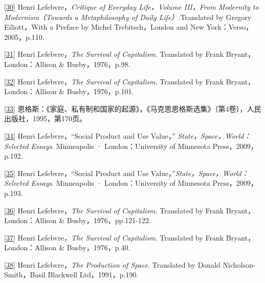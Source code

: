 \documentclass[UTF8, fontset = sourcesans, a4paper, oneside, zihao =
-4, scheme=chinese, no-math, space=true]{ctexbook}
\begin{document}
\protect\hypertarget{part0008_split_003.htmlux5cux23m30}{}{}\protect\hyperlink{part0008_split_002.htmlux5cux23w30}{{[}30{]}}
Henri Lefebvre，\emph{Critique of Everyday Life，Volume III，From
Modernity to Modernism（Towards a Metaphilosophy of Daily
Life）}.Translated by Gregory Eiliott，With a Preface by Michel
Trebitsch，London and New York：Verso，2005，p.110.

\protect\hypertarget{part0008_split_003.htmlux5cux23m31}{}{}\protect\hyperlink{part0008_split_002.htmlux5cux23w31}{{[}31{]}}
Henri Lefebvre，\emph{The Survival of Capitalism}. Translated by Frank
Bryant，London：Allison \& Busby，1976，p.98.

\protect\hypertarget{part0008_split_003.htmlux5cux23m32}{}{}\protect\hyperlink{part0008_split_002.htmlux5cux23w32}{{[}32{]}}
Henri Lefebvre，\emph{The Survival of Capitalism}. Translated by Frank
Bryant，London：Allison \& Busby，1976，p.101.

\protect\hypertarget{part0008_split_003.htmlux5cux23m33}{}{}\protect\hyperlink{part0008_split_002.htmlux5cux23w33}{{[}33{]}}
恩格斯：《家庭、私有制和国家的起源》，《马克思恩格斯选集》（第4卷），人民出版社，1995，第170页。

\protect\hypertarget{part0008_split_003.htmlux5cux23m34}{}{}\protect\hyperlink{part0008_split_002.htmlux5cux23w34}{{[}34{]}}
Henri Lefebvre，``Social Product and Use Value，''
\emph{State，Space，World：Selected Essays}. Minneapolis ·
London：University of Minnesota Press，2009，p.192.

\protect\hypertarget{part0008_split_003.htmlux5cux23m35}{}{}\protect\hyperlink{part0008_split_002.htmlux5cux23w35}{{[}35{]}}
Henri Lefebvre，``Social Product and Use
Value，''\emph{State，Space，World：Selected Essays}. Minneapolis ·
London：University of Minnesota Press，2009，p.193.

\protect\hypertarget{part0008_split_003.htmlux5cux23m36}{}{}\protect\hyperlink{part0008_split_002.htmlux5cux23w36}{{[}36{]}}
Henri Lefebvre，\emph{The Survival of Capitalism}. Translated by Frank
Bryant，London：Allison \& Busby，1976，pp.121-122.

\protect\hypertarget{part0008_split_003.htmlux5cux23m37}{}{}\protect\hyperlink{part0008_split_002.htmlux5cux23w37}{{[}37{]}}
Henri Lefebvre，\emph{The Survival of Capitalism}. Translated by Frank
Bryant，London：Allison \& Busby，1976，p.40.

\protect\hypertarget{part0008_split_003.htmlux5cux23m38}{}{}\protect\hyperlink{part0008_split_002.htmlux5cux23w38}{{[}38{]}}
Henri Lefebvre，\emph{The Production of Space}. Translated by Donald
Nicholson-Smith，Basil Blackwell Ltd，1991，p.190.
\end{document}
